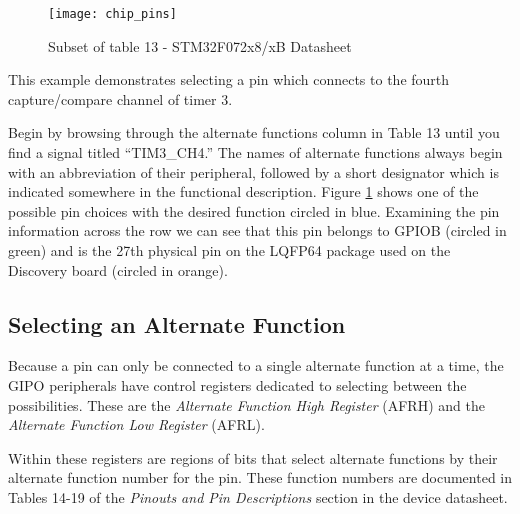 \documentclass[openany,11pt,fleqn]{book} %
\begin{document}
%    
    \begin{figure}[]
        \centering\texttt{[image: chip\_pins]}
        \caption{Subset of table 13 - STM32F072x8/xB Datasheet}
        \label{chip_pins}
    \end{figure}

    \begin{example}
        \label{example2}
            This example demonstrates selecting a pin which connects to the fourth capture/compare channel of timer 3. 
            
            Begin by browsing through the alternate functions column in Table 13 until you find a signal titled ``TIM3\_CH4.'' The names of alternate functions always begin with an abbreviation of their peripheral, followed by a short designator which is indicated somewhere in the functional description. Figure \ref{chip_pins} shows one of the possible pin choices with the desired function circled in blue. Examining the pin information across the row we can see that this pin belongs to GPIOB (circled in green) and is the 27th physical pin on the LQFP64 package used on the Discovery board (circled in orange).
        
    \end{example}
    
    \subsection{Selecting an Alternate Function}
    Because a pin can only be connected to a single alternate function at a time, the GIPO peripherals have control registers dedicated to selecting between the possibilities. These are the \textit{Alternate Function High Register} (AFRH) and the  \textit{Alternate Function Low Register} (AFRL). 
    
    Within these registers are regions of bits that select alternate functions by their alternate function number for the pin. These function numbers are documented in Tables 14-19 of the \textit{Pinouts and Pin Descriptions} section in the device datasheet. 
%    
\end{document}
